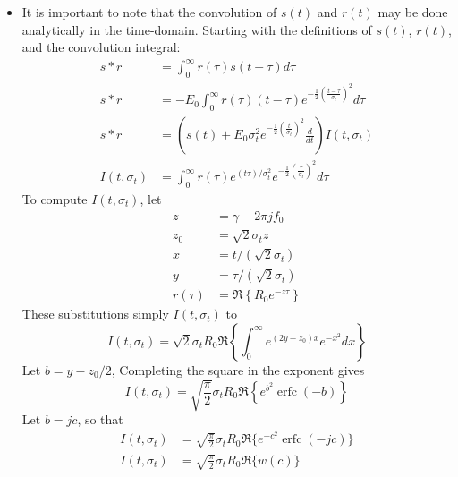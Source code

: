 \documentclass[amsmath,amssymb,aps,prd,10pt,twocolumn,showkeys]{revtex4}
\DeclareMathOperator\erfc{erfc}
\begin{document}
\begin{itemize}
\begin{figure}[hb]
\caption{\label{fig:fig1} (Top) The thin black line represents $s(t) * r(t)$.  The dark gray envelope represents the envelope of $s(t) * r(t)$ computed with the Python3 package scipy.special.hilbert. The light gray envelope represents Eq. \ref{eq:final}. (Bottom) Same as top, for different parameter values.}
\end{figure}
\item It is important to note that the convolution of $s(t)$ and $r(t)$ may be done analytically in the time-domain.  Starting with the definitions of $s(t)$, $r(t)$, and the convolution integral:
\begin{align}
s * r &= \int_0^{\infty} r(\tau) s(t-\tau) d\tau \\
s * r &= -E_0 \int_0^{\infty} r(\tau) (t-\tau) e^{-\frac{1}{2}\left(\frac{t-\tau}{\sigma_t}\right)^2}d\tau \\
s * r &= \left(s(t) + E_0 \sigma_t^2 e^{-\frac{1}{2}\left(\frac{t}{\sigma_t}\right)^2} \frac{d}{dt} \right)I(t,\sigma_t) \label{eq:conv_1} \\
I(t,\sigma_t) &= \int_0^{\infty} r(\tau) e^{(t\tau)/\sigma_t^2} e^{-\frac{1}{2}\left(\frac{\tau}{\sigma_t}\right)^2}d\tau
\end{align}
To compute $I(t,\sigma_t)$, let
\begin{align}
z &= \gamma - 2\pi j f_0 \\
z_0 &= \sqrt{2}\sigma_t z\\
x &= t/(\sqrt{2} \sigma_t) \\
y &= \tau/(\sqrt{2} \sigma_t) \\
r(\tau) &= \Re\left\lbrace R_0 e^{-z\tau}\right\rbrace
\end{align}
These substitutions simply $I(t,\sigma_t)$ to
\begin{equation}
I(t,\sigma_t) = \sqrt{2} \sigma_t R_0 \Re \left\lbrace\int_0^{\infty} e^{(2y-z_0)x} e^{-x^2} dx \right\rbrace
\end{equation}
Let $b = y-z_0/2$, Completing the square in the exponent gives
\begin{equation}
I(t,\sigma_t) = \sqrt{\frac{\pi}{2}} \sigma_t R_0 \Re\left\lbrace e^{b^2} \erfc(-b) \right\rbrace
\end{equation}
Let $b = jc$, so that
\begin{align}
I(t,\sigma_t) &= \sqrt{\frac{\pi}{2}} \sigma_t R_0 \Re\lbrace e^{-c^2} \erfc(-jc) \rbrace \\
I(t,\sigma_t) &= \sqrt{\frac{\pi}{2}} \sigma_t R_0 \Re\lbrace w(c) \rbrace
\end{align}

\end{itemize}
\end{document}
